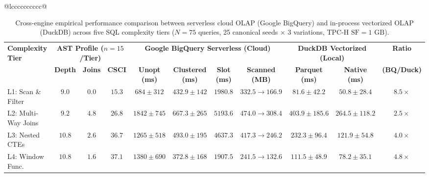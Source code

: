 \documentclass[10pt,a4paper]{article}
\begin{document}
\begin{table}[!t]
\begin{tabular}{@{}lcccccccccc@{}}
\bottomrule
{}\\
\end{tabular}
\end{table}

\begin{table}[!t]
\centering
\caption{Cross-engine empirical performance comparison between serverless cloud OLAP (Google BigQuery) and in-process vectorized OLAP (DuckDB) across five SQL complexity tiers ($N=75$ queries, 25 canonical seeds $\times$ 3 variations, TPC-H $\text{SF}=1\text{ GB}$).}
\label{tab:cross_engine_main}
\scriptsize
\setlength{\tabcolsep}{4.2pt}
\renewcommand{\arraystretch}{1.12}
\begin{tabular}{@{}lcccccccccc@{}}
\toprule
\multirow{2}{*}{\textbf{Complexity Tier}} & \multicolumn{3}{c}{\textbf{AST Profile ($n=15$/Tier)}} & \multicolumn{4}{c}{\textbf{Google BigQuery Serverless (Cloud)}} & \multicolumn{2}{c}{\textbf{DuckDB Vectorized (Local)}} & \textbf{Ratio} \\
\cmidrule(lr){2-4} \cmidrule(lr){5-8} \cmidrule(lr){9-10} \cmidrule(lr){11-11}
 & \textbf{Depth} & \textbf{Joins} & \textbf{CSCI} & \textbf{Unopt (ms)} & \textbf{Clustered (ms)} & \textbf{Slot (ms)} & \textbf{Scanned (MB)} & \textbf{Parquet (ms)} & \textbf{Native (ms)} & \textbf{(BQ/Duck)} \\
\midrule
L1: Scan \& Filter & $9.0$ & $0.0$ & $15.3$ & $684 \pm 312$ & $432.9 \pm 142$ & $1980.8$ & $332.5 \rightarrow 166.9$ & $81.6 \pm 42.2$ & $\mathbf{50.8 \pm 28.4}$ & $8.5\times$ \\
L2: Multi-Way Joins & $9.2$ & $4.8$ & $26.8$ & $1842 \pm 745$ & $667.3 \pm 265$ & $5193.6$ & $474.0 \rightarrow 308.4$ & $403.9 \pm 185.6$ & $\mathbf{264.5 \pm 118.2}$ & $2.5\times$ \\
L3: Nested CTEs & $10.8$ & $2.6$ & $36.7$ & $1265 \pm 518$ & $493.0 \pm 195$ & $4637.3$ & $417.3 \rightarrow 246.2$ & $232.3 \pm 96.4$ & $\mathbf{121.9 \pm 54.8}$ & $4.0\times$ \\
L4: Window Func. & $10.8$ & $1.6$ & $37.1$ & $1380 \pm 690$ & $372.8 \pm 168$ & $1907.5$ & $241.5 \rightarrow 132.6$ & $111.5 \pm 48.9$ & $\mathbf{78.2 \pm 35.1}$ & $4.8\times$ \\

\end{tabular}
\end{table}
\end{document}
